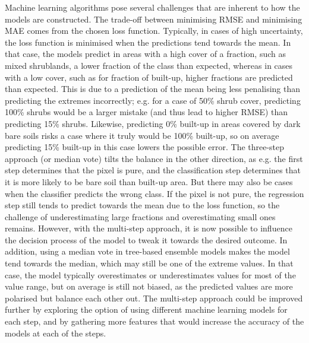 \documentclass[review,authoryear,3p]{elsarticle}
\begin{document}
Machine learning algorithms pose several challenges that are inherent to how the models are constructed.
The trade-off between minimising \gls{RMSE} and minimising \gls{MAE} comes from the chosen loss function.
Typically, in cases of high uncertainty, the loss function is minimised when the predictions tend towards the mean.
In that case, the models predict in areas with a high cover of a fraction, such as mixed shrublands, a lower fraction of the class than expected, whereas in cases with a low cover, such as for fraction of built-up, higher fractions are predicted than expected.
This is due to a prediction of the mean being less penalising than predicting the extremes incorrectly; e.g. for a case of 50\% shrub cover, predicting 100\% shrubs would be a larger mistake (and thus lead to higher \gls{RMSE}) than predicting 15\% shrubs.
Likewise, predicting 0\% built-up in areas covered by dark bare soils risks a case where it truly would be 100\% built-up, so on average predicting 15\% built-up in this case lowers the possible error.
The three-step approach (or median vote) tilts the balance in the other direction, as e.g. the first step determines that the pixel is pure, and the classification step determines that it is more likely to be bare soil than built-up area.
But there may also be cases when the classifier predicts the wrong class.
If the pixel is not pure, the regression step still tends to predict towards the mean due to the loss function, so the challenge of underestimating large fractions and overestimating small ones remains.
However, with the multi-step approach, it is now possible to influence the decision process of the model to tweak it towards the desired outcome.
In addition, using a median vote in tree-based ensemble models makes the model tend towards the median, which may still be one of the extreme values.
In that case, the model typically overestimates or underestimates values for most of the value range, but on average is still not biased, as the predicted values are more polarised but balance each other out.
The multi-step approach could be improved further by exploring the option of using different machine learning models for each step, and by gathering more features that would increase the accuracy of the models at each of the steps.
\end{document}
